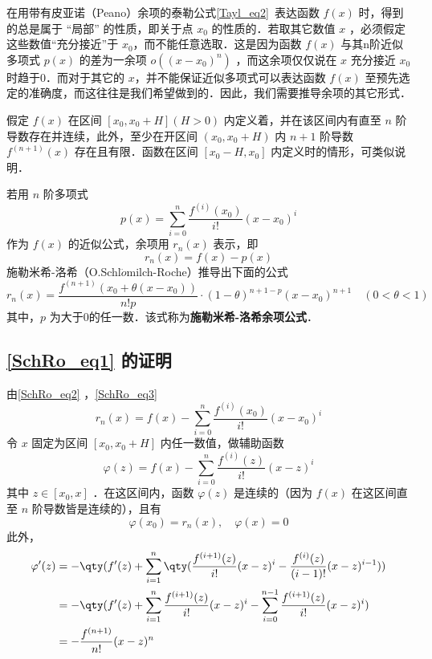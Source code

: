 
在用带有皮亚诺（Peano）余项的泰勒公式\autoref{Tayl_eq2}~表达函数 $f(x)$ 时，得到的总是属于 “局部” 的性质，即关于点 $x_0$ 的性质的．若取其它数值 $x$ ，必须假定这些数值“充分接近”于 $x_0$，而不能任意选取．这是因为函数 $f(x)$ 与其n阶近似多项式 $p(x)$ 的差为一余项 $o((x-x_0)^n)$ ，而这余项仅仅说在 $x$ 充分接近 $x_0$ 时趋于0．而对于其它的 $x$，并不能保证近似多项式可以表达函数 $f(x)$ 至预先选定的准确度，而这往往是我们希望做到的．因此，我们需要推导余项的其它形式．

假定 $f(x)$ 在区间 $[x_0,x_0+H](H>0)$ 内定义着，并在该区间内有直至 $n$ 阶导数存在并连续，此外，至少在开区间 $(x_0,x_0+H)$ 内 $n+1$ 阶导数 $f^{(n+1)}(x)$ 存在且有限．函数在区间 $[x_0-H,x_0]$ 内定义时的情形，可类似说明．

若用 $n$ 阶多项式
\begin{equation}\label{SchRo_eq2}
p(x)=\sum_{i=0}^n\frac{f^{(i)}(x_0)}{i!}(x-x_0)^i
\end{equation}
作为 $f(x)$ 的近似公式，余项用 $r_n(x)$ 表示，即 
\begin{equation}\label{SchRo_eq3}
r_n(x)=f(x)-p(x)
\end{equation}
施勒米希-洛希（O.Schl$\ddot{o}$milch-Roche）推导出下面的公式
\begin{equation}\label{SchRo_eq1}
r_n(x)=\frac{f^{(n+1)}(x_0+\theta(x-x_0))}{n!p}\cdot(1-\theta)^{n+1-p}(x-x_0)^{n+1}\quad (0<\theta<1)
\end{equation}
其中，$p$ 为大于0的任一数．该式称为\textbf{施勒米希-洛希余项公式}．
\subsection{\autoref{SchRo_eq1} 的证明}
由\autoref{SchRo_eq2} ，\autoref{SchRo_eq3} 
\begin{equation}
r_n(x)=f(x)-\sum_{i=0}^n\frac{f^{(i)}(x_0)}{i!}(x-x_0)^i
\end{equation}
令 $x$ 固定为区间 $[x_0,x_0+H]$ 内任一数值，做辅助函数
\begin{equation}
\varphi(z)=f(x)-\sum_{i=0}^n\frac{f^{(i)}(z)}{i!}(x-z)^i
\end{equation}
其中 $z\in[x_0,x]$ ．在这区间内，函数 $\varphi(z)$ 是连续的（因为 $f(x)$ 在这区间直至 $n$ 阶导数皆是连续的），且有
\begin{equation}\label{SchRo_eq4}
\varphi(x_0)=r_n(x),\quad \varphi(x)=0
\end{equation}
此外，
\begin{equation}\label{SchRo_eq6}
\begin{aligned}
\varphi'(z)&=-\qty(f'(z)+\sum_{i=1}^n\qty(\frac{f^{(i+1)}(z)}{i!}(x-z)^i-\frac{f^{(i)}(z)}{(i-1)!}(x-z)^{i-1}))\\
&=-\qty(f'(z)+\sum_{i=1}^n\frac{f^{(i+1)}(z)}{i!}(x-z)^i-\sum_{i=0}^{n-1}\frac{f^{(i+1)}(z)}{i!}(x-z)^{i})\\
&=-\frac{f^{(n+1)}}{n!}(x-z)^{n}
\end{aligned}
\end{equation}

